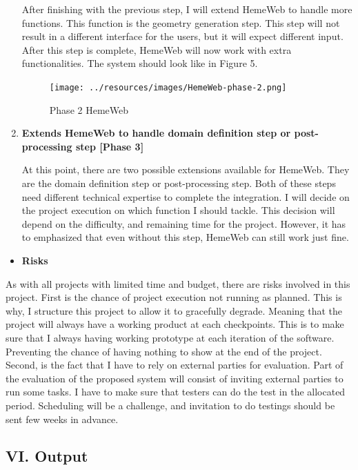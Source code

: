 \documentclass[]{article}
\providecommand{\tightlist}{%
  \setlength{\itemsep}{0pt}\setlength{\parskip}{0pt}}
\begin{document}
\begin{enumerate}
  After finishing with the previous step, I will extend HemeWeb to
  handle more functions. This function is the geometry generation step.
  This step will not result in a different interface for the users, but
  it will expect different input. After this step is complete, HemeWeb
  will now work with extra functionalities. The system should look like
  in Figure 5.

  \begin{figure}[H]
  \centering
  \texttt{[image: ../resources/images/HemeWeb-phase-2.png]}
  \caption{Phase 2 HemeWeb}
  \end{figure}
\item
  \textbf{Extends HemeWeb to handle domain definition step or
  post-processing step {[}Phase 3{]}}

  At this point, there are two possible extensions available for
  HemeWeb. They are the domain definition step or post-processing step.
  Both of these steps need different technical expertise to complete the
  integration. I will decide on the project execution on which function
  I should tackle. This decision will depend on the difficulty, and
  remaining time for the project. However, it has to emphasized that
  even without this step, HemeWeb can still work just fine.
\end{enumerate}

\begin{itemize}
\tightlist
\item
  \textbf{Risks}
\end{itemize}

As with all projects with limited time and budget, there are risks
involved in this project. First is the chance of project execution not
running as planned. This is why, I structure this project to allow it to
gracefully degrade. Meaning that the project will always have a working
product at each checkpoints. This is to make sure that I always having
working prototype at each iteration of the software. Preventing the
chance of having nothing to show at the end of the project. Second, is
the fact that I have to rely on external parties for evaluation. Part of
the evaluation of the proposed system will consist of inviting external
parties to run some tasks. I have to make sure that testers can do the
test in the allocated period. Scheduling will be a challenge, and
invitation to do testings should be sent few weeks in advance.

\subsection{VI. Output}\label{vi.-output}
\end{document}
